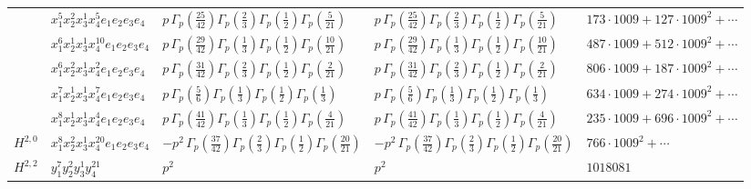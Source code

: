 \documentclass[11pt]{article}
\begin{document}
\begin{table}[ht]
{\begin{tabular}{@{}lllll@{}}
 & $x_{1}^{5} x_{2}^{2} x_{3}^{1} x_{4}^{5}  e_{1} e_{2} e_{3} e_{4}$ & $p \, \Gamma_p \left( \frac{25}{42} \right) \Gamma_p \left( \frac{2}{3} \right) \Gamma_p \left( \frac{1}{2} \right) \Gamma_p \left( \frac{5}{21} \right)$ & $p \, \Gamma_p \left( \frac{25}{42} \right) \Gamma_p \left( \frac{2}{3} \right) \Gamma_p \left( \frac{1}{2} \right) \Gamma_p \left( \frac{5}{21} \right)$ & $173{\cdot}1009{+}127{\cdot}1009^{2}{+}\cdots$ \\
 & $x_{1}^{6} x_{2}^{1} x_{3}^{1} x_{4}^{10}  e_{1} e_{2} e_{3} e_{4}$ & $p \, \Gamma_p \left( \frac{29}{42} \right) \Gamma_p \left( \frac{1}{3} \right) \Gamma_p \left( \frac{1}{2} \right) \Gamma_p \left( \frac{10}{21} \right)$ & $p \, \Gamma_p \left( \frac{29}{42} \right) \Gamma_p \left( \frac{1}{3} \right) \Gamma_p \left( \frac{1}{2} \right) \Gamma_p \left( \frac{10}{21} \right)$ & $487{\cdot}1009{+}512{\cdot}1009^{2}{+}\cdots$ \\
 & $x_{1}^{6} x_{2}^{2} x_{3}^{1} x_{4}^{2}  e_{1} e_{2} e_{3} e_{4}$ & $p \, \Gamma_p \left( \frac{31}{42} \right) \Gamma_p \left( \frac{2}{3} \right) \Gamma_p \left( \frac{1}{2} \right) \Gamma_p \left( \frac{2}{21} \right)$ & $p \, \Gamma_p \left( \frac{31}{42} \right) \Gamma_p \left( \frac{2}{3} \right) \Gamma_p \left( \frac{1}{2} \right) \Gamma_p \left( \frac{2}{21} \right)$ & $806{\cdot}1009{+}187{\cdot}1009^{2}{+}\cdots$ \\
 & $x_{1}^{7} x_{2}^{1} x_{3}^{1} x_{4}^{7}  e_{1} e_{2} e_{3} e_{4}$ & $p \, \Gamma_p \left( \frac{5}{6} \right) \Gamma_p \left( \frac{1}{3} \right) \Gamma_p \left( \frac{1}{2} \right) \Gamma_p \left( \frac{1}{3} \right)$ & $p \, \Gamma_p \left( \frac{5}{6} \right) \Gamma_p \left( \frac{1}{3} \right) \Gamma_p \left( \frac{1}{2} \right) \Gamma_p \left( \frac{1}{3} \right)$ & $634{\cdot}1009{+}274{\cdot}1009^{2}{+}\cdots$ \\
 & $x_{1}^{8} x_{2}^{1} x_{3}^{1} x_{4}^{4}  e_{1} e_{2} e_{3} e_{4}$ & $p \, \Gamma_p \left( \frac{41}{42} \right) \Gamma_p \left( \frac{1}{3} \right) \Gamma_p \left( \frac{1}{2} \right) \Gamma_p \left( \frac{4}{21} \right)$ & $p \, \Gamma_p \left( \frac{41}{42} \right) \Gamma_p \left( \frac{1}{3} \right) \Gamma_p \left( \frac{1}{2} \right) \Gamma_p \left( \frac{4}{21} \right)$ & $235{\cdot}1009{+}696{\cdot}1009^{2}{+}\cdots$ \\
\midrule
$H^{2,0}$ & $x_{1}^{8} x_{2}^{2} x_{3}^{1} x_{4}^{20}  e_{1} e_{2} e_{3} e_{4}$ & $- p^{2} \, \Gamma_p \left( \frac{37}{42} \right) \Gamma_p \left( \frac{2}{3} \right) \Gamma_p \left( \frac{1}{2} \right) \Gamma_p \left( \frac{20}{21} \right)$ & $- p^{2} \, \Gamma_p \left( \frac{37}{42} \right) \Gamma_p \left( \frac{2}{3} \right) \Gamma_p \left( \frac{1}{2} \right) \Gamma_p \left( \frac{20}{21} \right)$ & $766{\cdot}1009^{2}{+}\cdots$ \\
\midrule
$H^{2,2}$ & $y_{1}^{7} y_{2}^{2} y_{3}^{1} y_{4}^{21}$ & $p^{2} \,$ & $p^{2} \,$ & $1018081$ \\
\bottomrule
\end{tabular}
}
\renewcommand{\arraystretch}{1.0}
\end{table}
\end{document}
